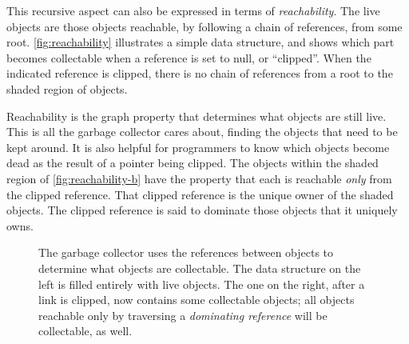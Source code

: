 This recursive aspect can also be expressed in terms of \emph{reachability}.
 The live objects are those objects reachable, by following a
chain of references, from some root. \autoref{fig:reachability} illustrates a
simple data structure, and shows which part becomes collectable when a reference
is set to null, or ``clipped''. When the indicated reference is clipped, there is
no chain of references from a root to the shaded region of objects.

Reachability is the graph property that determines what objects are still live.
This is all the garbage collector cares about, finding the objects that need to
be kept around. It is also helpful for programmers to know which objects become
dead as the result of a pointer being clipped. The objects within the shaded
region of \autoref{fig:reachability-b} have the property that each is reachable
\emph{only} from the clipped reference. That clipped reference is the unique
owner of the shaded objects. The clipped reference is said to dominate those
objects that it uniquely owns.

\begin{figure}
\centering
	\hspace{0.18\textwidth}
	\caption{The garbage collector uses the references between objects to
	determine what objects are collectable. The data structure on the left is
	filled entirely with live objects. The one on the right, after a link is
	clipped, now contains some collectable objects; all objects reachable only by
	traversing a \emph{dominating reference} will be collectable, as well.}
	\label{fig:reachability}
\end{figure}


